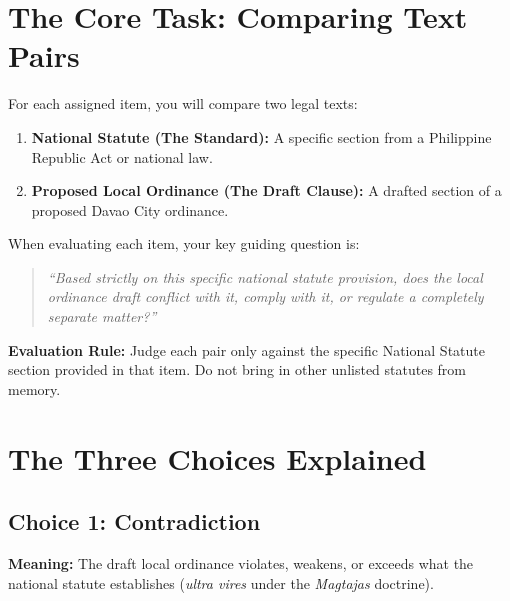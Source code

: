 \section{The Core Task: Comparing Text Pairs}
\label{sec:app_guide_task}

For each assigned item, you will compare two legal texts:
\begin{enumerate}
    \item \textbf{National Statute (The Standard):} A specific section from a Philippine Republic Act or national law.
    \item \textbf{Proposed Local Ordinance (The Draft Clause):} A drafted section of a proposed Davao City ordinance.
\end{enumerate}

\noindent When evaluating each item, your key guiding question is:
\begin{quote}
    \textit{``Based strictly on this specific national statute provision, does the local ordinance draft conflict with it, comply with it, or regulate a completely separate matter?''}
\end{quote}

\noindent\textbf{Evaluation Rule:} Judge each pair only against the specific National Statute section provided in that item. Do not bring in other unlisted statutes from memory.

\section{The Three Choices Explained}
\label{sec:app_guide_choices}

\subsection{Choice 1: Contradiction}
\textbf{Meaning:} The draft local ordinance violates, weakens, or exceeds what the national statute establishes (\textit{ultra vires} under the \textit{Magtajas} doctrine).

